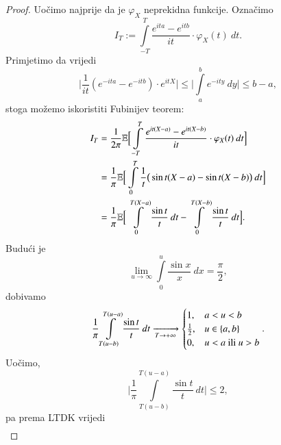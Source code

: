 \begin{proof}
    Uo\v cimo najprije da je $\varphi_X$ neprekidna funkcije.
    Ozna\v cimo
    \begin{equation*}
        I_T := \int\limits_{-T}^T \frac{e^{ita} - e^{itb}}{it} \cdot \varphi_X (t) \: d t.
    \end{equation*}
    Primjetimo da vrijedi
    \begin{equation*}
        \Big| \frac{1}{i t} (e^{- i t a} - e^{- i t b}) \cdot e^{i t X} \Big| \leq \Big| \int\limits_a^b e^{-ity} \: d y \Big| \leq b - a,
    \end{equation*}
    stoga mo\v zemo iskoristiti Fubinijev teorem:
    \begin{equation*}
        \begin{aligned}
            I_T &= \frac{1}{2 \pi} \mathbb{E} \Big[ \int\limits_{-T}^T \frac{e^{it(X - a)} - e^{it(X - b)}}{it} \cdot \varphi_X (t) \: d t \Big]\\
            &= \frac{1}{\pi} \mathbb{E} \Big[ \int\limits_0^T \frac{1}{t} \big( \sin t(X-a) - \sin t(X-b) \big) \: d t \Big]\\
            &= \frac{1}{\pi} \mathbb{E} \Big[ \int\limits_0^{T(X-a)} \frac{\sin t}{t} \: d t - \int\limits_0^{T (X-b)} \frac{\sin t}{t} \: d t \Big].
        \end{aligned}
    \end{equation*}
    Budu\' ci je
    \begin{equation*}
        \lim\limits_{u \to \infty} \int\limits_0^u \frac{\sin x}{x} \: d x = \frac{\pi}{2},
    \end{equation*}
    dobivamo
    \begin{equation*}
        \frac{1}{\pi} \int\limits_{T (u - b)}^{T (u - a)} \frac{\sin t}{t} \: dt \xrightarrow[T \to + \infty]{}
        \begin{cases}
            1,    &a < u < b\\
            \frac{1}{2}, &u \in \{a, b\}\\
            0,    &u < a \textnormal{ ili } u > b
        \end{cases}.
    \end{equation*}
    Uo\v cimo,
    \begin{equation*}
        \Big| \frac{1}{\pi} \int\limits_{T (u- b)}^{T (u - a)} \frac{\sin t}{t} \: d t \Big| \leq 2,
    \end{equation*}
    pa prema LTDK vrijedi
    \begin{equation*}
        \begin{aligned}

\end{aligned}
\end{equation*}
\end{proof}
